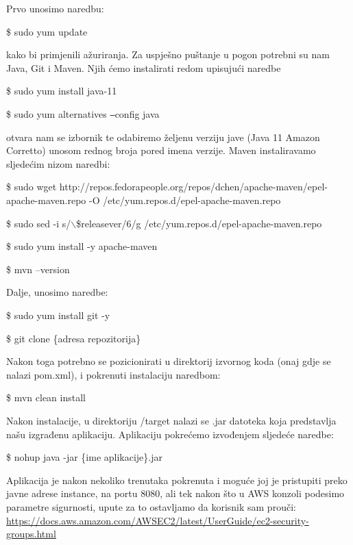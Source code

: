 			
			\noindent Prvo unosimo naredbu:
			\begin{center}
				\$ sudo yum update
			\end{center}
				kako bi primjenili ažuriranja. Za uspješno puštanje u pogon potrebni su nam Java, Git i Maven. Njih ćemo instalirati redom upisujući naredbe
				\begin{center}
					\$ sudo yum install java-11
				\end{center}
			\begin{center}
				\$ sudo yum alternatives  \texttt{--}config java
			\end{center}
			otvara nam se izbornik te odabiremo željenu verziju jave (Java 11 Amazon Corretto) unosom rednog broja pored imena verzije.
			Maven instaliravamo sljedećim nizom naredbi:
			\begin{center}
				\$ sudo wget http://repos.fedorapeople.org/repos/dchen/apache-maven/epel-apache-maven.repo -O /etc/yum.repos.d/epel-apache-maven.repo
				
				\$ sudo sed -i s/$\backslash$\$releasever/6/g /etc/yum.repos.d/epel-apache-maven.repo
				
				\$ sudo yum install -y apache-maven
			
				\$ mvn --version
			\end{center}
			Dalje, unosimo naredbe:
			\begin{center}
				\$ sudo yum install git -y
				
				\$ git clone \{adresa repozitorija\}
			\end{center}
			Nakon toga potrebno se pozicionirati u direktorij izvornog koda (onaj gdje se nalazi pom.xml), i pokrenuti instalaciju naredbom:
			\begin{center}
				\$ mvn clean install
			\end{center}
			Nakon instalacije, u direktoriju /target nalazi se .jar datoteka koja predstavlja našu izgrađenu aplikaciju. Aplikaciju pokrećemo izvođenjem sljedeće naredbe:
			\begin{center}
				\$ nohup java -jar \{ime aplikacije\}.jar
			\end{center}
			Aplikacija je nakon nekoliko trenutaka pokrenuta i moguće joj je pristupiti preko javne adrese instance, na portu 8080, ali tek nakon što u AWS konzoli podesimo parametre sigurnosti, upute za to ostavljamo da korisnik sam prouči: \url{https://docs.aws.amazon.com/AWSEC2/latest/UserGuide/ec2-security-groups.html}
		
		
		
